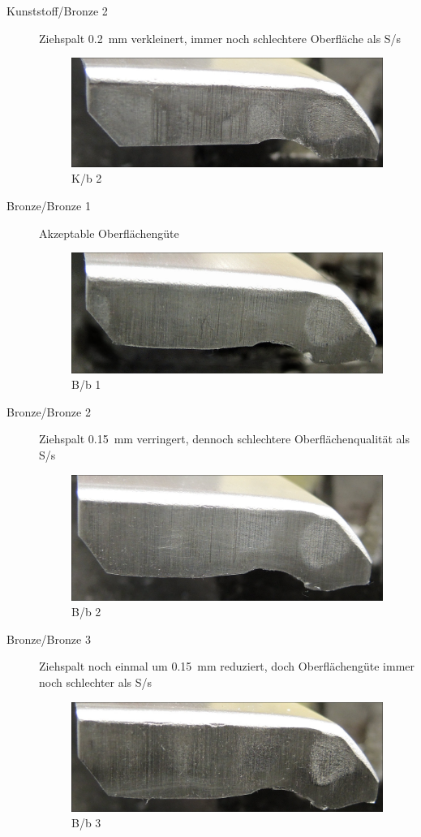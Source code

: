 \documentclass[12pt,a4paper,parskip,twoside,BCOR5mm,headsepline]{scrartcl}
\begin{document}
\begin{description*}
\begin{description}
\item[Kunststoff/Bronze 2] Ziehspalt \SI{0.2}{\milli\meter} verkleinert, immer noch schlechtere Oberfläche als S/s
\begin{figure}[H]
\centering
\includegraphics[width=.8\textwidth]{Kb2}
\caption{K/b 2}
\label{fig:Kb2}
\end{figure}

\item[Bronze/Bronze 1] Akzeptable Oberflächengüte
\begin{figure}[H]
\centering
\includegraphics[width=.8\textwidth]{Bb1}
\caption{B/b 1}
\label{fig:Bb1}
\end{figure}

\item[Bronze/Bronze 2] Ziehspalt \SI{0.15}{\milli\meter} verringert,  dennoch schlechtere Oberflächenqualität als S/s
\begin{figure}[H]
\centering
\includegraphics[width=.8\textwidth]{Bb2}
\caption{B/b 2}
\label{fig:Bb2}
\end{figure}

\item[Bronze/Bronze 3] Ziehspalt noch einmal um \SI{0.15}{\milli\meter}  reduziert, doch Oberflächengüte immer noch schlechter als S/s
\begin{figure}[H]
\centering
\includegraphics[width=.8\textwidth]{Bb3a}
\caption{B/b 3}
\label{fig:Bb3a}
\end{figure}


\end{description}
\end{description*}
\end{document}
